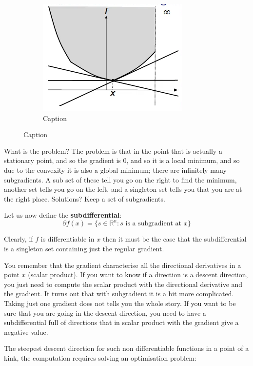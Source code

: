 \begin{figure}
\begin{subfigure}{0.31\textwidth}
        \centering
        \includegraphics[scale=0.4]{figures/2/sub-diffs/sub_diffs3.png}
        \caption{Caption}
        \label{fig:sub_diffs3}
    \end{subfigure}
\end{figure}
\par What is the problem? The problem is that in the point that is actually a stationary point, and so the gradient is 0, and so it is a local minimum, and so due to the convexity it is also a global minimum; there are infinitely many subgradients. A sub set of these tell you go on the right to find the minimum, another set tells you go on the left, and a singleton set tells you that you are at the right place. Solutions? Keep a set of subgradients.
\par Let us now define the \textbf{subdifferential}:
\begin{equation}
    \partial f(x) = \{s \in \mathbb{R}^n : s \mbox{ is a subgradient at } x\}
\end{equation}
\par Clearly, if $f$ is differentiable in $x$ then it must be the case that the subdifferential is a singleton set containing just the regular gradient.
\par You remember that the gradient characterise all the directional derivatives in a point $x$ (scalar product). If you want to know if a direction is a descent direction, you just need to compute the scalar product with the directional derivative and the gradient. It turns out that with subgradient it is a bit more complicated. Taking just one gradient does not tells you the whole story. If you want to be sure that you are going in the descent direction, you need to have a subdifferential full of directions that in scalar product with the gradient give a negative value.
\par The steepest descent direction for such non differentiable functions in a point of a kink, the computation requires solving an optimisation problem:
